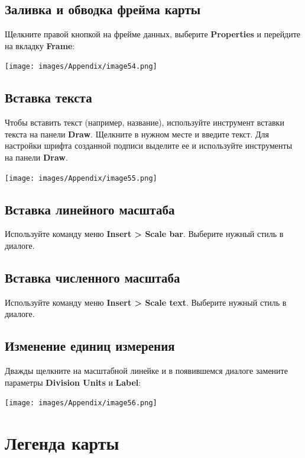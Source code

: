 \documentclass[12pt,]{book}
\begin{document}
\hypertarget{section-50}{%
\section{Заливка и обводка фрейма карты}\label{section-50}}

Щелкните правой кнопкой на фрейме данных, выберите \textbf{Properties} и перейдите на вкладку \textbf{Frame}:

\texttt{[image: images/Appendix/image54.png]}

\hypertarget{section-51}{%
\section{Вставка текста}\label{section-51}}

Чтобы вставить текст (например, название), используйте инструмент вставки текста на панели \textbf{Draw}. Щелкните в нужном месте и введите текст. Для настройки шрифта созданной подписи выделите ее и используйте инструменты на панели \textbf{Draw}.

\texttt{[image: images/Appendix/image55.png]}

\hypertarget{section-52}{%
\section{Вставка линейного масштаба}\label{section-52}}

Используйте команду меню \textbf{Insert \textgreater{} Scale bar}. Выберите нужный стиль в диалоге.

\hypertarget{section-53}{%
\section{Вставка численного масштаба}\label{section-53}}

Используйте команду меню \textbf{Insert \textgreater{} Scale text}. Выберите нужный стиль в диалоге.

\hypertarget{section-54}{%
\section{Изменение единиц измерения}\label{section-54}}

Дважды щелкните на масштабной линейке и в появившемся диалоге замените параметры \textbf{Division Units} и \textbf{Label}:

\texttt{[image: images/Appendix/image56.png]}

\hypertarget{manual-legend}{%
\chapter{Легенда карты}\label{manual-legend}}
\end{document}
